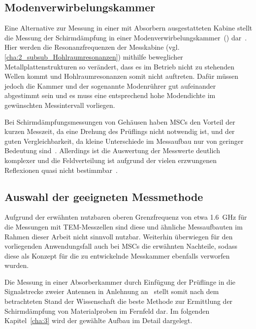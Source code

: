 \subsection{Modenverwirbelungskammer}
Eine Alternative zur Messung in einer mit Absorbern ausgestatteten Kabine stellt die Messung der Schirmdämpfung in einer Modenverwirbelungskammer~() dar~\cite{EMV}. Hier werden die Resonanzfrequenzen der Messkabine (vgl. \Abschnitt\ref{cha:2_subsub_Hohlraumresonanzen}) mithilfe beweglicher Metallplattenstrukturen so verändert, dass es im Betrieb nicht zu stehenden Wellen kommt und Hohlraumresonanzen somit nicht auftreten. Dafür müssen jedoch die Kammer und der sogenannte Modenrührer gut aufeinander abgestimmt sein und es muss eine entsprechend hohe Modendichte im gewünschten Messintervall vorliegen. 
\par
\vspace{\linespace}
Bei Schirmdämpfungsmessungen von Gehäusen haben \acp{MSC} den Vorteil der kurzen Messzeit, da eine Drehung des Prüflings nicht notwendig ist, und der guten Vergleichbarkeit, da kleine Unterschiede im Messaufbau nur von geringer Bedeutung sind~\cite{EMV}. Allerdings ist die Auswertung der Messwerte deutlich komplexer und die Feldverteilung ist aufgrund der vielen erzwungenen Reflexionen quasi nicht bestimmbar~\cite{EMV}.  


\subsection{Auswahl der geeigneten Messmethode}
Aufgrund der erwähnten nutzbaren oberen Grenzfrequenz von etwa \SI{1,6}{\giga\hertz} für die Messungen mit TEM-Messzellen sind diese und ähnliche Messaufbauten im Rahmen dieser Arbeit nicht sinnvoll nutzbar. Weiterhin überwiegen für den vorliegenden Anwendungsfall auch bei \acp{MSC} die erwähnten Nachteile, sodass diese als Konzept für die zu entwickelnde Messkammer ebenfalls verworfen wurden. 
\par
\vspace{\linespace}
Die Messung in einer Absorberkammer durch Einfügung der Prüflinge in die Signalstrecke zweier Antennen in Anlehnung an~\cite{DIN_EN_61000-5-7, IEEE_299} stellt somit nach dem betrachteten Stand der Wissenschaft die beste Methode zur Ermittlung der Schirmdämpfung von Materialproben im Fernfeld dar. Im folgenden Kapitel~\ref{cha:3} wird der gewählte Aufbau im Detail dargelegt.










